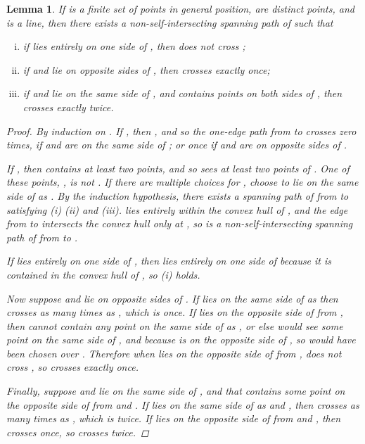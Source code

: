 \documentclass[12pt]{article}
\newtheorem{lemma}{Lemma}
\theoremstyle{definition}
\begin{document}
\begin{lemma}
  \label{lem:spanning-path-crossing}
  If  is a finite set of points in general position,  are distinct points, and  is a line, then there exists a non-self-intersecting spanning path  of  such that
  \begin{enumerate}[(i)]
  \item if  lies entirely on one side of , then  does not cross ;
  \item if  and  lie on opposite sides of , then  crosses  exactly once;
  \item if  and  lie on the same side of , and  contains points on both sides of , then  crosses  exactly twice.
  \end{enumerate}
  
  \begin{proof}
    By induction on .
    If , then , and so the one-edge path from  to  crosses  zero times, if  and  are on the same side of ; or once if  and  are on opposite sides of .

    If , then  contains at least two points, and so  sees at least two points of .
    One of these points, , is not .
    If there are multiple choices for , choose  to lie on the same side of  as .
    By the induction hypothesis, there exists a spanning path  of  from  to  satisfying (i) (ii) and (iii).
     lies entirely within the convex hull of , and the edge from  to  intersects the convex hull only at , so  is a non-self-intersecting spanning path of  from  to .
    
    If  lies entirely on one side of , then  lies entirely on one side of  because it is contained in the convex hull of , so (i) holds.

    Now suppose  and  lie on opposite sides of .
    If  lies on the same side of  as  then  crosses  as many times as , which is once.
    If  lies on the opposite side of  from , then  cannot contain any point on the same side of  as , or else  would see some point  on the same side of , and  because  is on the opposite side of , so  would have been chosen over .
    Therefore when  lies on the opposite side of  from ,  does not cross , so  crosses  exactly once.
    
    Finally, suppose  and  lie on the same side of , and that  contains some point  on the opposite side of  from  and .
    If  lies on the same side of  as  and , then  crosses  as many times as , which is twice.
    If  lies on the opposite side of  from  and , then  crosses  once, so  crosses  twice.
  \end{proof}
\end{lemma}
\end{document}
